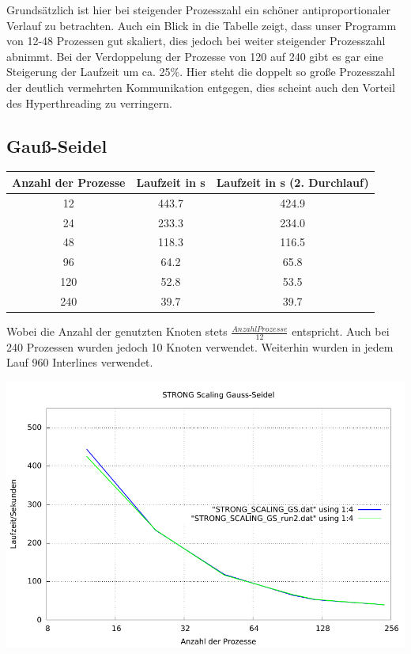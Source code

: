 \documentclass[a4paper]{article}
\begin{document}
Grundsätzlich ist hier bei steigender Prozesszahl ein schöner antiproportionaler Verlauf zu betrachten. Auch ein Blick in die Tabelle zeigt, dass unser Programm von 12-48 Prozessen gut skaliert, dies jedoch bei weiter steigender Prozesszahl abnimmt. Bei der Verdoppelung der Prozesse von 120 auf 240 gibt es gar eine Steigerung der Laufzeit um ca. 25\%. Hier steht die doppelt so große Prozesszahl der deutlich vermehrten Kommunikation entgegen, dies scheint auch den Vorteil des Hyperthreading zu verringern.

\subsection{Gauß-Seidel}
\begin{tabular}{|c|c|c|}
\hline 
Anzahl der Prozesse & Laufzeit in s & Laufzeit in s (2. Durchlauf) \\ 
\hline 
12 & 443.7 & 424.9 \\ 
\hline 
24 & 233.3 & 234.0 \\ 
\hline 
48 & 118.3 & 116.5 \\ 
\hline 
96 & 64.2 & 65.8 \\ 
\hline 
120 & 52.8 & 53.5 \\ 
\hline 
240 & 39.7 & 39.7 \\ 
\hline
\end{tabular} 

Wobei die Anzahl der genutzten Knoten stets $\frac{Anzahl Prozesse}{12}$ entspricht. Auch bei 240 Prozessen wurden jedoch 10 Knoten verwendet. Weiterhin wurden in jedem Lauf 960 Interlines verwendet.

\includegraphics[scale=0.8]{img/STRONG_SCALING_GS_laufzeit.pdf}
\end{document}

